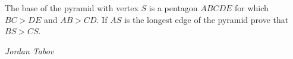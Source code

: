 The base of the pyramid with vertex $S$ is a pentagon $ABCDE$ for which $BC>DE$ and $AB>CD$. If $AS$ is the longest edge of the pyramid prove that $BS>CS$.

\textit{Jordan Tabov}